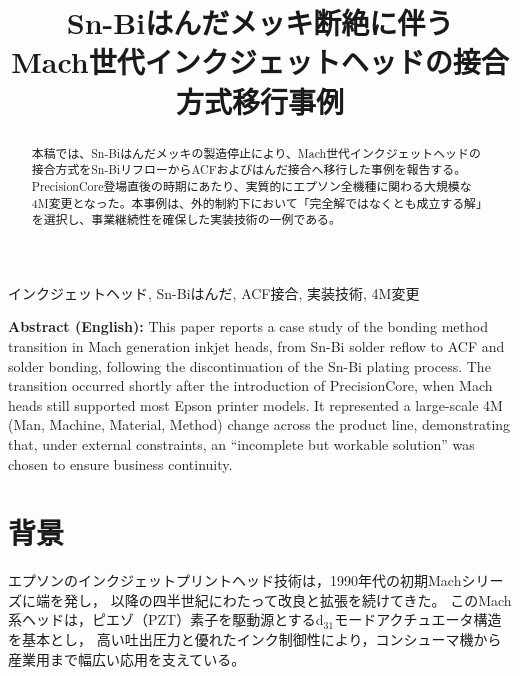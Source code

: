 \documentclass[conference]{IEEEtran}
\begin{document}
\title{Sn-Biはんだメッキ断絶に伴う\\Mach世代インクジェットヘッドの接合方式移行事例}

\author{%
}

\maketitle

\begin{abstract}
本稿では、Sn-Biはんだメッキの製造停止により、Mach世代インクジェットヘッドの接合方式をSn-BiリフローからACFおよびはんだ接合へ移行した事例を報告する。PrecisionCore登場直後の時期にあたり、実質的にエプソン全機種に関わる大規模な4M変更となった。本事例は、外的制約下において「完全解ではなくとも成立する解」を選択し、事業継続性を確保した実装技術の一例である。
\end{abstract}

\begin{IEEEkeywords}
インクジェットヘッド, Sn-Biはんだ, ACF接合, 実装技術, 4M変更
\end{IEEEkeywords}

\vspace{1em}
\noindent
\textbf{Abstract (English):}  
This paper reports a case study of the bonding method transition in Mach generation inkjet heads, from Sn-Bi solder reflow to ACF and solder bonding, following the discontinuation of the Sn-Bi plating process.  
The transition occurred shortly after the introduction of PrecisionCore, when Mach heads still supported most Epson printer models.  
It represented a large-scale 4M (Man, Machine, Material, Method) change across the product line, demonstrating that, under external constraints, an “incomplete but workable solution” was chosen to ensure business continuity.

\section{背景}

エプソンのインクジェットプリントヘッド技術は，1990年代の初期Machシリーズに端を発し，
以降の四半世紀にわたって改良と拡張を続けてきた。  
このMach系ヘッドは，ピエゾ（PZT）素子を駆動源とするd$_{31}$モードアクチュエータ構造を基本とし，
高い吐出圧力と優れたインク制御性により，コンシューマ機から産業用まで幅広い応用を支えている。  
\end{document}
